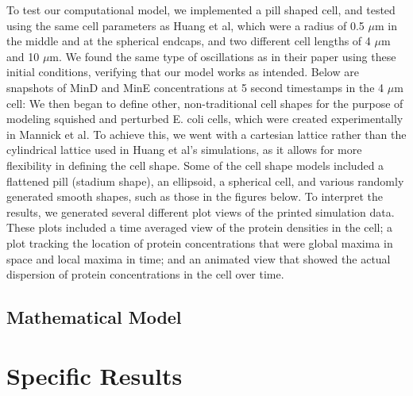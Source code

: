 \documentclass[letterpaper,twocolumn,amsmath,amssymb,pre]{revtex4-1}
\begin{document}
To test our computational model, we implemented a pill shaped cell, and
tested using the same cell parameters as Huang et al, which were a radius
of 0.5 $\mu$m in the middle and at the spherical endcaps, and two different
cell lengths of 4 $\mu$m and 10 $\mu$m. We found the same type of
oscillations as in their paper using these initial conditions, verifying
that our model works as intended. Below are snapshots of MinD and MinE
concentrations at 5 second timestamps in the 4 $\mu$m cell:
\newline
{}
\newline
\newline
We then began to define other, non-traditional cell shapes for the purpose of
modeling squished and perturbed E. coli cells, which were created
experimentally in Mannick et al. To achieve this, we went with a
cartesian lattice rather than the cylindrical lattice used in Huang et 
al's simulations, as it allows for more flexibility in defining the 
cell shape. Some of the cell shape models included a flattened pill
(stadium shape), an ellipsoid, a spherical cell, and various randomly
generated smooth shapes, such as those in the figures below. 
\newline
{}
\newline
\newline
To interpret the results, we generated several different plot views of
the printed simulation data. These plots included a time averaged view
of the protein densities in the cell; a plot tracking the location of
protein concentrations that were global maxima in space and local maxima in 
time; and an animated view that showed the actual dispersion of
protein concentrations in the cell over time. 
\subsection{Mathematical Model}
\section{Specific Results}
\end{document}
